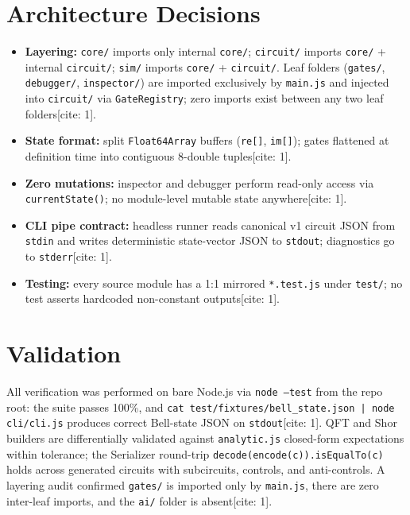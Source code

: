 \documentclass[conference]{IEEEtran}
\begin{document}
\section{Architecture Decisions}
\begin{itemize}
    \item \textbf{Layering:} \texttt{core/} imports only internal \texttt{core/}; \texttt{circuit/} imports \texttt{core/} + internal \texttt{circuit/}; \texttt{sim/} imports \texttt{core/} + \texttt{circuit/}. Leaf folders (\texttt{gates/}, \texttt{debugger/}, \texttt{inspector/}) are imported exclusively by \texttt{main.js} and injected into \texttt{circuit/} via \texttt{GateRegistry}; zero imports exist between any two leaf folders[cite: 1].
    \item \textbf{State format:} split \texttt{Float64Array} buffers (\texttt{re[]}, \texttt{im[]}); gates flattened at definition time into contiguous 8-double tuples[cite: 1].
    \item \textbf{Zero mutations:} inspector and debugger perform read-only access via \texttt{currentState()}; no module-level mutable state anywhere[cite: 1].
    \item \textbf{CLI pipe contract:} headless runner reads canonical v1 circuit JSON from \texttt{stdin} and writes deterministic state-vector JSON to \texttt{stdout}; diagnostics go to \texttt{stderr}[cite: 1].
    \item \textbf{Testing:} every source module has a 1:1 mirrored \texttt{*.test.js} under \texttt{test/}; no test asserts hardcoded non-constant outputs[cite: 1].
\end{itemize}

\section{Validation}
All verification was performed on bare Node.js via \texttt{node --test} from the repo root: the suite passes 100\%, and \texttt{cat test/fixtures/bell\_state.json | node cli/cli.js} produces correct Bell-state JSON on \texttt{stdout}[cite: 1]. QFT and Shor builders are differentially validated against \texttt{analytic.js} closed-form expectations within tolerance; the Serializer round-trip \texttt{decode(encode(c)).isEqualTo(c)} holds across generated circuits with subcircuits, controls, and anti-controls. A layering audit confirmed \texttt{gates/} is imported only by \texttt{main.js}, there are zero inter-leaf imports, and the \texttt{ai/} folder is absent[cite: 1].
\end{document}
